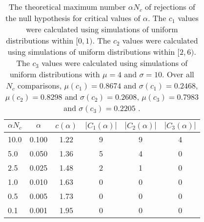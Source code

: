 \begin{table}[h!]
\begin{center}
\begin{tabular}{| l | c | c | c | c | c |}\hline
$\alpha N_c$ & $\alpha$ & $c(\alpha)$ & $|C_1(\alpha)|$ & $|C_2(\alpha)|$ & $|C_3(\alpha)|$ \\\hline\hline
10.0 & 0.100 & 1.22 & 9 & 9 & 4 \\\hline
5.0 & 0.050 & 1.36 & 5 & 4 & 0 \\\hline
2.5 & 0.025 & 1.48 & 2 & 1 & 0 \\\hline
1.0 & 0.010 & 1.63 & 0 & 0 & 0 \\\hline
0.5 & 0.005 & 1.73 & 0 & 0 & 0 \\\hline
0.1 & 0.001 & 1.95 & 0 & 0 & 0 \\\hline
\end{tabular}
\caption{The theoretical maximum number $\alpha N_c$ of rejections
        of the null hypothesis for critical values of $\alpha$.
        The $c_1$ values were calculated using simulations of uniform distributions within $[0,1)$.
        The $c_2$ values were calculated using simulations of uniform distributions within $[2,6)$.
        The $c_3$ values were calculated using simulations of uniform distributions with $\mu=4$ and $\sigma=10$.
        Over all $N_c$ comparisons,
         $\mu(c_1)=0.8674$ and $\sigma(c_1)=0.2468$,
         $\mu(c_2)=0.8298$ and $\sigma(c_2)=0.2608$,
         $\mu(c_3)=0.7983$ and $\sigma(c_3)=0.2205$ .
        }
\end{center}
\end{table}
